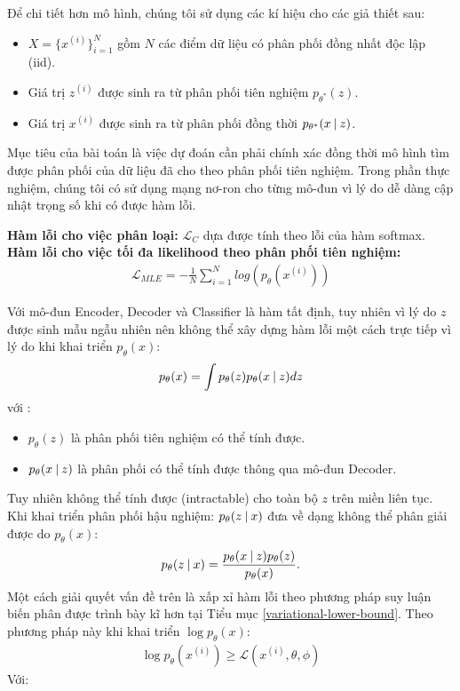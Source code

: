 Để chi tiết hơn mô hình, chúng tôi sử dụng các kí hiệu cho các giả thiết sau:
\begin{itemize}
    \item $X = \{x^{(i)}\}_{i=1}^N$ gồm $N$ các điểm dữ liệu có phân phối đồng nhất độc lập (iid).
    \item Giá trị $z^{(i)}$ được sinh ra từ phân phối tiên nghiệm $p_{\theta^*}(z)$.
    \item Giá trị $x^{(i)}$ được sinh ra từ phân phối đồng thời $p_{\theta^*}(x \:\lvert\: z)$.
\end{itemize}

 Mục tiêu của bài toán là việc dự đoán cần phải chính xác đồng thời mô hình tìm được phân phối của dữ liệu đã cho theo phân phối tiên nghiệm. Trong phần thực nghiệm, chúng tôi có sử dụng mạng nơ-ron cho từng mô-đun vì lý do dễ dàng cập nhật trọng số  khi có được hàm lỗi.
 
 \textbf{Hàm lỗi cho việc phân loại:} $\mathcal{L}_C$ dựa được tính theo lỗi của hàm softmax.
 \textbf{Hàm lỗi cho việc tối đa likelihood theo phân phối tiên nghiệm:}
\begin{align}
  \mathcal{L}_{MLE} = -\frac{1}{N} \sum_{i=1}^N log(p_\theta(x^{(i)}))  
\end{align}

Với mô-đun Encoder, Decoder và Classifier là hàm tất định, tuy nhiên vì lý do $z$ được sinh mẫu ngẫu nhiên nên không thể xây dựng hàm lỗi một cách trực tiếp vì lý do khi khai triển $p_\theta(x)$:
\begin{equation} \label{eq:intractable_likelihood}
p_\theta(x) = \int p_\theta(z)p_\theta(x \:\lvert\: z) dz
\end{equation}
với :
\begin{itemize}
    \item $p_\theta(z)$ là phân phối tiên nghiệm có thể tính được.
    \item $p_\theta(x \:\lvert\: z)$ là phân phối có thể tính được thông qua mô-đun Decoder.
\end{itemize}

Tuy nhiên không thể tính được (intractable) cho toàn bộ $z$ trên miền liên tục. Khi khai triển phân phối hậu nghiệm: $p_\theta(z \:\lvert\: x)$ đưa về dạng không thể phân giải được do $p_\theta(x)$:
\begin{align}
  p_\theta(z \:\lvert\: x) = \frac{p_\theta(x \:\lvert\: z)p_\theta(z)}{p_\theta(x)}\label{eqn:intractable_posterior}.
\end{align}
Một cách giải quyết vấn đề trên là xấp xỉ hàm lỗi theo phương pháp suy luận biến phân được trình bày kĩ hơn tại Tiểu mục \ref{variational-lower-bound}. Theo phương pháp này khi khai triển $\log p_\theta(x)$:
\begin{align}
\log p_\theta(x^{(i)})  \geq \mathcal{L}(x^{(i)}, \theta, \phi) 
\end{align}
Với:

